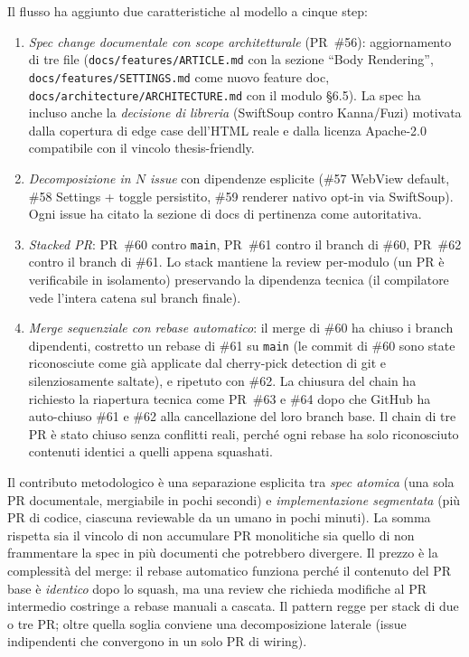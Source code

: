 Il flusso ha aggiunto due caratteristiche al modello a cinque step:
\begin{enumerate}
  \item \emph{Spec change documentale con scope architetturale}
        (PR~\#56): aggiornamento di tre file
        (\texttt{docs/features/ARTICLE.md} con la sezione ``Body
        Rendering'', \texttt{docs/features/SETTINGS.md} come nuovo
        feature doc, \texttt{docs/architecture/ARCHITECTURE.md} con
        il modulo §6.5). La spec ha incluso anche la
        \emph{decisione di libreria} (SwiftSoup contro Kanna/Fuzi)
        motivata dalla copertura di edge case dell'HTML reale e
        dalla licenza Apache-2.0 compatibile con il vincolo
        thesis-friendly.
  \item \emph{Decomposizione in $N$ issue} con dipendenze esplicite
        (\#57 WebView default, \#58 Settings + toggle persistito,
        \#59 renderer nativo opt-in via SwiftSoup). Ogni issue ha
        citato la sezione di docs di pertinenza come autoritativa.
  \item \emph{Stacked PR}: PR~\#60 contro \texttt{main}, PR~\#61
        contro il branch di \#60, PR~\#62 contro il branch di \#61.
        Lo stack mantiene la review per-modulo (un PR è
        verificabile in isolamento) preservando la dipendenza
        tecnica (il compilatore vede l'intera catena sul branch
        finale).
  \item \emph{Merge sequenziale con rebase automatico}: il merge di
        \#60 ha chiuso i branch dipendenti, costretto un rebase di
        \#61 su \texttt{main} (le commit di \#60 sono state
        riconosciute come già applicate dal cherry-pick detection
        di git e silenziosamente saltate), e ripetuto con \#62. La
        chiusura del chain ha richiesto la riapertura tecnica come
        PR~\#63 e \#64 dopo che GitHub ha auto-chiuso \#61 e \#62
        alla cancellazione del loro branch base. Il chain di tre PR
        è stato chiuso senza conflitti reali, perché ogni rebase ha
        solo riconosciuto contenuti identici a quelli appena
        squashati.
\end{enumerate}

Il contributo metodologico è una separazione esplicita tra
\emph{spec atomica} (una sola PR documentale, mergiabile in pochi
secondi) e \emph{implementazione segmentata} (più PR di codice,
ciascuna reviewable da un umano in pochi minuti). La somma rispetta
sia il vincolo di non accumulare PR monolitiche sia quello di
non frammentare la spec in più documenti che potrebbero divergere.
Il prezzo è la complessità del merge: il rebase automatico funziona
perché il contenuto del PR base è \emph{identico} dopo lo squash, ma
una review che richieda modifiche al PR intermedio costringe a rebase
manuali a cascata. Il pattern regge per stack di due o tre PR; oltre
quella soglia conviene una decomposizione laterale (issue indipendenti
che convergono in un solo PR di wiring).

